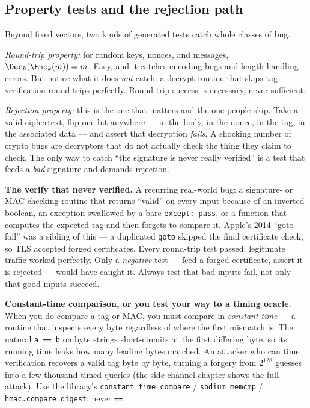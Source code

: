 \subsection{Property tests and the rejection path}

Beyond fixed vectors, two kinds of generated tests catch whole classes of bug.

\emph{Round-trip property:} for random keys, nonces, and messages,
$\Dec_k(\Enc_k(m)) = m$. Easy, and it catches encoding bugs and length-handling
errors. But notice what it does \emph{not} catch: a decrypt routine that skips tag
verification round-trips perfectly. Round-trip success is necessary, never
sufficient.

\emph{Rejection property:} this is the one that matters and the one people skip.
Take a valid ciphertext, flip one bit anywhere --- in the body, in the nonce, in
the tag, in the associated data --- and assert that decryption \emph{fails}. A
shocking number of crypto bugs are decryptors that do not actually check the thing
they claim to check. The only way to catch ``the signature is never really
verified'' is a test that feeds a \emph{bad} signature and demands rejection.

\begin{attackbox}
\textbf{The verify that never verified.} A recurring real-world bug: a signature- or
MAC-checking routine that returns ``valid'' on every input because of an inverted
boolean, an exception swallowed by a bare \texttt{except: pass}, or a function that
computes the expected tag and then forgets to compare it. Apple's 2014
``goto fail'' was a sibling of this --- a duplicated \texttt{goto} skipped the final
certificate check, so TLS accepted forged certificates. Every round-trip test
passed; legitimate traffic worked perfectly. Only a \emph{negative} test --- feed a
forged certificate, assert it is rejected --- would have caught it. Always test that
bad inputs fail, not only that good inputs succeed.
\end{attackbox}

\begin{trapbox}
\textbf{Constant-time comparison, or you test your way to a timing oracle.} When you
do compare a tag or MAC, you must compare in \emph{constant time} --- a routine that
inspects every byte regardless of where the first mismatch is. The natural
\texttt{a == b} on byte strings short-circuits at the first differing byte, so its
running time leaks how many leading bytes matched. An attacker who can time
verification recovers a valid tag byte by byte, turning a forgery from $2^{128}$
guesses into a few thousand timed queries (the side-channel chapter shows the full
attack). Use the library's \texttt{constant\_time\_compare} /
\texttt{sodium\_memcmp} / \texttt{hmac.compare\_digest}; never \texttt{==}.
\end{trapbox}

